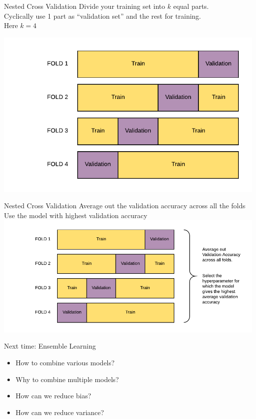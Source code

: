 \documentclass[usenames,dvipsnames]{beamer}
\begin{document}
\begin{frame}{Nested Cross Validation}
Divide your training set into $k$ equal parts.\\
Cyclically use 1 part as ``validation set'' and the rest for training.\\
Here $k = 4$
\begin{center}
\includegraphics[scale=0.7]{../assets/cross-validation/diagrams/cross-validation.pdf}
\end{center}
\end{frame}

\begin{frame}{Nested Cross Validation}
Average out the validation accuracy across all the folds\\
Use the model with highest validation accuracy\\
\includegraphics[width = \textwidth]{../assets/cross-validation/diagrams/cross-validation-avg.pdf}
\end{frame}

\begin{frame}{Next time: Ensemble Learning}
\begin{itemize}
\item How to combine various models?
\item Why to combine multiple models?
\item How can we reduce bias?
\item How can we reduce variance?
\end{itemize}
\end{frame}
\end{document}
